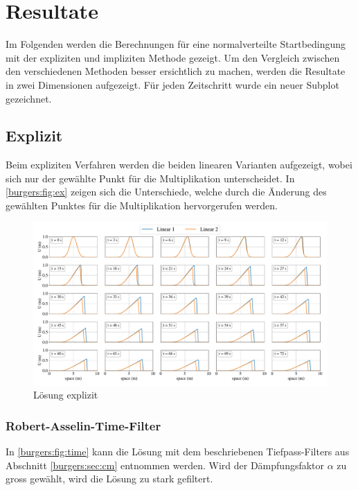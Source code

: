 %
%
\section{Resultate
\label{burgers:section:results}}

	Im Folgenden werden die Berechnungen f\"ur eine normalverteilte Startbedingung mit der expliziten und impliziten Methode gezeigt.
	Um den Vergleich zwischen den verschiedenen Methoden besser ersichtlich zu machen, werden die Resultate in zwei Dimensionen aufgezeigt.
	F\"ur jeden Zeitschritt wurde ein neuer Subplot gezeichnet.

	\subsection{Explizit}

	Beim expliziten Verfahren werden die beiden linearen Varianten aufgezeigt,
	wobei sich nur der gew\"ahlte Punkt f\"ur die Multiplikation unterscheidet.
	In \autoref{burgers:fig:ex} zeigen sich die Unterschiede, welche durch die \"Anderung des gewählten Punktes für die Multiplikation hervorgerufen werden.


    \begin{figure}
	\centering
	\includegraphics[width=1\textwidth]{papers/burgers/BurgersEquation/lin_paper.pdf}
	\caption{L\"osung explizit}
	\label{burgers:fig:ex}
	\end{figure}

	\subsubsection{Robert-Asselin-Time-Filter}
	In \autoref{burgers:fig:time} kann die L\"osung mit dem beschriebenen Tiefpass-Filters aus Abschnitt \ref{burgers:sec:cm} entnommen werden.
	Wird der D\"ampfungsfaktor $\alpha$ zu gross gew\"ahlt, wird die L\"osung zu stark gefiltert.

